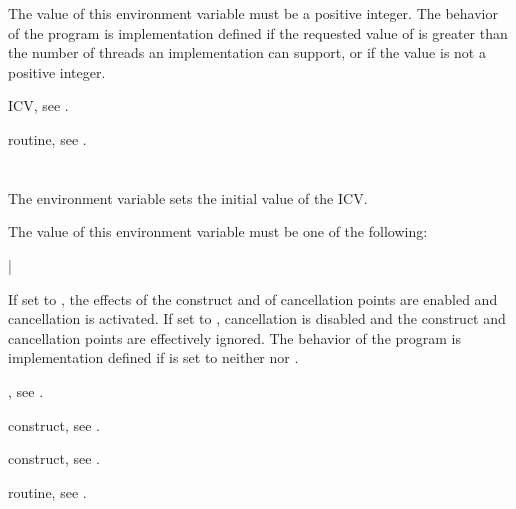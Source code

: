 The value of this environment variable must be a positive integer. The
behavior of the program is implementation defined if the requested value
of  is greater than the number of threads an
implementation can support, or if the value is not a positive integer.

\begin{crossrefs}
\item {} ICV, see .

\item {} routine,
see .
\end{crossrefs}



\section{}
\label{sec:OMP_CANCELLATION}
The  environment variable sets the initial value
of the  ICV.

The value of this environment variable must be one of the following:

{|}

If set to , the
effects of the  construct and of cancellation points are
enabled and cancellation is activated. If set to , cancellation
is disabled and the  construct and cancellation points are
effectively ignored. The behavior of the program is implementation defined
if  is set to neither  nor .

\begin{crossrefs}
\item {}, see .

\item {} construct, see .

\item {} construct,
see .

\item {} routine,
see .
\end{crossrefs}



